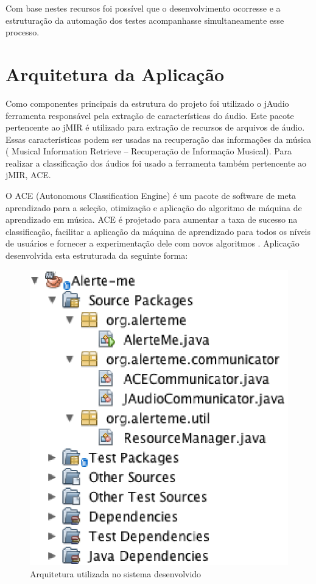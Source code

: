 Com base nestes recursos foi possível que o desenvolvimento ocorresse e a estruturação da automação dos testes acompanhasse simultaneamente esse processo. 

\section{Arquitetura da Aplicação}

Como componentes principais da estrutura do projeto foi utilizado o jAudio ferramenta responsável pela extração de características do áudio. Este pacote pertencente ao jMIR é utilizado para extração de recursos de arquivos de áudio. Essas características podem ser usadas na recuperação das informações da música ( Musical Information Retrieve – Recuperação de Informação Musical). Para realizar a classificação dos áudios foi usado a ferramenta também pertencente ao jMIR, ACE.

O ACE (Autonomous Classification Engine) é um pacote de software de meta aprendizado para a seleção, otimização e aplicação do algoritmo de máquina de aprendizado em música. ACE é projetado para aumentar a taxa de sucesso na classificação, facilitar a aplicação da máquina de aprendizado para todos os níveis de usuários e fornecer a experimentação dele com novos algoritmos \cite{ace}. Aplicação desenvolvida esta estruturada da seguinte forma: 

\begin{figure}[H]
	\centering
	\captionsetup{justification=centering,margin=2cm}
	\includegraphics[scale=0.80]{capitulos/validacao/figuras/arquiteturaDoSistemaDesenvolvido.eps}
	\caption{Arquitetura utilizada no sistema desenvolvido}
	\label{fig:result-engajamento}
\end{figure}

